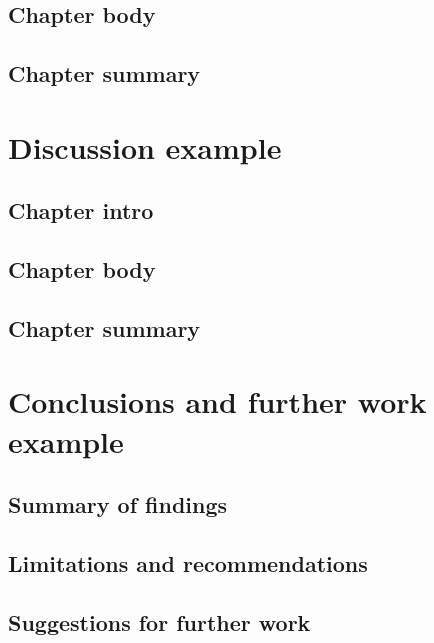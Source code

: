    \section{Chapter body}
   \section{Chapter summary}

\chapter{Discussion example}
   \section{Chapter intro}
   \section{Chapter body}
   \section{Chapter summary}

\chapter{Conclusions and further work example}
   \section{Summary of findings}
   \section{Limitations and recommendations}
   \section{Suggestions for further work}